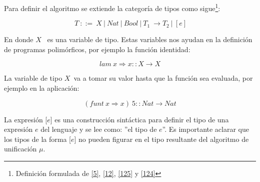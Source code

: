    \begin{definition}
        Para definir el algoritmo se extiende la categoría de tipos como sigue\footnote{Definición formulada de \hyperlink{5}{[5]},  \hyperlink{12}{[12]}, \hyperlink{125}{[125]} y \hyperlink{124}{[124]}}:
        
        $$\ T\ ::=\ X\ |\ Nat\ |\ Bool\ |\ T_1\ \to T_2\ |\ [e]$$
        
        En donde $X$ $\,$ es una variable de tipo. Estas variables nos ayudan en la definición de programas polimórficos, por ejemplo la función identidad:
        
        $$lam\ x\Rightarrow x :: X \to X$$ 
        
        La variable de tipo $X$$\,$ va a tomar su valor hasta que la función sea evaluada, por ejemplo en la aplicación:
       
        $$(funt\ x \Rightarrow x)\ 5 :: Nat \to Nat$$

        La expresión [$e$] es una construcción sintáctica para definir el tipo de una expresión $e$ del lenguaje y se lee como: ''el tipo de $e$''. Es importante aclarar que los tipos de la forma [$e$] no pueden figurar en el tipo resultante del algoritmo de unificación $\mu$.  
            
    \end{definition}

   \bigskip    


